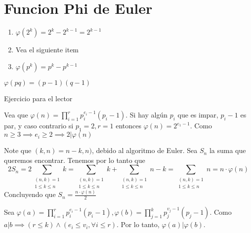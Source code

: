 \section{Funcion Phi de Euler}

\begin{sol}
	\begin{enumerate}
		\item $\varphi (2^k) = 2^k-2^{k-1} = 2^{k-1}$
		\item Vea el siguiente item
		\item $\varphi(p^{k}) = p^{k}-p^{k-1}$
		\end{enumerate}
\end{sol}

\begin{sol}
	$\varphi(pq) = (p-1)(q-1)$
\end{sol}

\begin{sol}
	Ejercicio para el lector
\end{sol}

\begin{sol}
	Vea que $\varphi(n) = \prod_{i=1}^{r} p_{i}^{e_{i}-1}(p_{i}-1)$. Si hay alg\'un $p_{i}$ que es impar, $p_{i}-1$ es par, y caso contrario si $p_{1}=2, r = 1$ entonces $\varphi(n) = 2^{e_{1}-1}$. Como $n\geq 3 \implies e_{i}\geq 2 \implies 2|\varphi(n)$
\end{sol}

\begin{sol}
	Note que $(k, n) = n-k, n)$, debido al algoritmo de Euler. Sea $S_{n}$ la suma que queremos encontrar. Tenemos por lo tanto que 
	\begin{equation}
	2S_{n} = 2 \sum\limits_{\substack{(n, k) = 1 \\ 1\leq k \leq n}} k = \sum\limits_{\substack{(n, k) = 1 \\ 1\leq k \leq n}} k + \sum\limits_{\substack{(n, k) = 1 \\ 1\leq k \leq n}} n-k = \sum\limits_{\substack{(n, k) = 1 \\ 1\leq k \leq n}} n = n \cdot \varphi(n)
	\end{equation}
	Concluyendo que $S_{n} = \frac{n \cdot \varphi(n)}{2}$
\end{sol}



\begin{sol}
	Sea $\varphi(a) = \prod_{i=1}^{r} p_{i}^{e_{i}-1}(p_{i}-1), \varphi(b) = \prod_{j=1}^{k} p_{j}^{v_{j}-1}(p_{j}-1)$. Como $a|b\implies (r\leq k) \land ( e_{i} \leq v_{i}, \forall i\leq r)$. Por lo tanto, $\varphi(a)|\varphi(b)$.
\end{sol}

